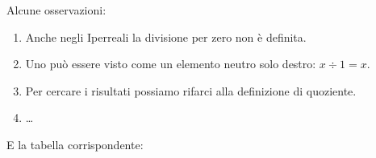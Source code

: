 \begin{multicols}{2}
Alcune osservazioni:
\begin{enumerate} [noitemsep]
 \item Anche negli Iperreali la divisione per zero non è definita.
 \item Uno può essere visto come un elemento neutro solo destro: $x \div 1=x$.
 \item Per cercare i risultati possiamo rifarci alla definizione di quoziente.
 \item \dots
\end{enumerate}
E la tabella corrispondente:
\begin{center}
\renewcommand{\arraystretch}{.0}
\end{center}
\end{multicols}

